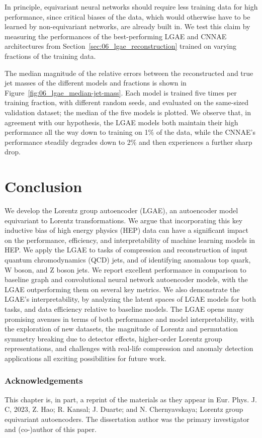 In principle, equivariant neural networks should require less training data for high performance, since critical biases of the data, which would otherwise have to be learned by non-equivariant networks, are already built in.
We test this claim by measuring the performances of the best-performing LGAE and CNNAE architectures from Section~\ref{sec:06_lgae_reconstruction} trained on varying fractions of the training data.

The median magnitude of the relative errors between the reconstructed and true jet masses of the different models and fractions is shown in Figure~\ref{fig:06_lgae_median-jet-mass}.
Each model is trained five times per training fraction, with different random seeds, and evaluated on the same-sized validation dataset; the median of the five models is plotted.
We observe that, in agreement with our hypothesis, the LGAE models both maintain their high performance all the way down to training on 1\% of the data, while the CNNAE's performance steadily degrades down to 2\% and then experiences a further sharp drop.


\section{Conclusion}
\label{sec:06_lgae_conclusion}

We develop the Lorentz group autoencoder (LGAE), an autoencoder model equivariant to Lorentz transformations.
We argue that incorporating this key inductive bias of high energy physics (HEP) data can have a significant impact on the performance, efficiency, and interpretability of machine learning models in HEP.
We apply the LGAE to tasks of compression and reconstruction of input quantum chromodynamics (QCD) jets, and of identifying anomalous top quark, W boson, and Z boson jets. 
We report excellent performance in comparison to baseline graph and convolutional neural network autoencoder models, with the LGAE outperforming them on several key metrics.
We also demonstrate the LGAE's interpretability, by analyzing the latent spaces of LGAE models for both tasks, and data efficiency relative to baseline models.
The LGAE opens many promising avenues in terms of both performance and model interpretability, with the exploration of new datasets, the magnitude of Lorentz and permutation symmetry breaking due to detector effects, higher-order Lorentz group representations, and challenges with real-life compression and anomaly detection applications all exciting possibilities for future work.

\subsubsection{Acknowledgements}

This chapter is, in part, a reprint of the materials as they appear in
Eur. Phys. J. C, 2023, Z. Hao; R. Kansal; J. Duarte; and N. Chernyavskaya; Lorentz group equivariant autoencoders.
The dissertation author was the primary investigator and (co-)author of this paper.